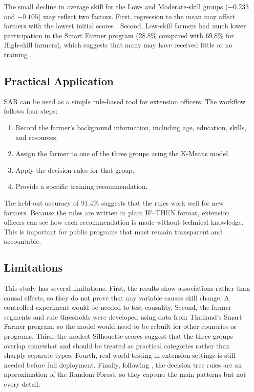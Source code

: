 \documentclass[fleqn,10pt,lineno]{wlpeerj}
\begin{document}
The small decline in average skill for the Low- and Moderate-skill groups ($-0.233$ and $-0.105$) may reflect two factors. First, regression to the mean may affect farmers with the lowest initial scores \citep{davis2012}. Second, Low-skill farmers had much lower participation in the Smart Farmer program (28.8\% compared with 69.8\% for High-skill farmers), which suggests that many may have received little or no training \citep{anderson2004}.

\subsection{Practical Application}
SAR can be used as a simple rule-based tool for extension officers. The workflow follows four steps:  
\begin{enumerate}
    \item Record the farmer's background information, including age, education, skills, and resources.
    \item Assign the farmer to one of the three groups using the K-Means model.
    \item Apply the decision rules for that group.
    \item Provide a specific training recommendation.
\end{enumerate}

The held-out accuracy of 91.4\% suggests that the rules work well for new farmers. Because the rules are written in plain IF--THEN format, extension officers can see how each recommendation is made without technical knowledge. This is important for public programs that must remain transparent and accountable.

\subsection{Limitations}
This study has several limitations. First, the results show associations rather than causal effects, so they do not prove that any variable causes skill change. A controlled experiment would be needed to test causality. Second, the farmer segments and rule thresholds were developed using data from Thailand's Smart Farmer program, so the model would need to be rebuilt for other countries or programs. Third, the modest Silhouette scores suggest that the three groups overlap somewhat and should be treated as practical categories rather than sharply separate types. Fourth, real-world testing in extension settings is still needed before full deployment. Finally, following \citet{rudin2019}, the decision tree rules are an approximation of the Random Forest, so they capture the main patterns but not every detail.
\end{document}
